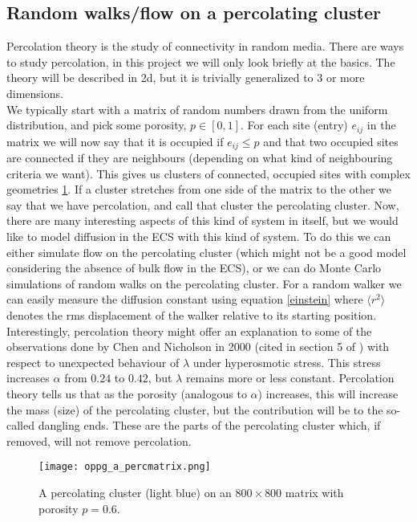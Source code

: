 \documentclass[a4paper,english, 12pt, twoside]{article}
\begin{document}
\subsection{Random walks/flow on a percolating cluster}
Percolation theory is the study of connectivity in random media. There are ways to study percolation, in this project we will only look briefly at the basics. The theory will be described in 2d, but it is trivially generalized to 3 or more dimensions.\\
We typically start with a matrix of random numbers drawn from the uniform distribution, and pick some porosity, $p\in[0,1]$. 
For each site (entry) $e_{ij}$ in the matrix we will now say that it is occupied if $e_{ij} \leq p$ and that two occupied sites are connected if they are neighbours (depending on what kind of neighbouring criteria we want). 
This gives us clusters of connected, occupied sites with complex geometries \ref{perc}. 
If a cluster stretches from one side of the matrix to the other we say that we have percolation, and call that cluster the percolating cluster. 
Now, there are many interesting aspects of this kind of system in itself, but we would like to model diffusion in the ECS with this kind of system. 
To do this we can either simulate flow on the percolating cluster (which might not be a good model considering the absence of bulk flow in the ECS), or we can do Monte Carlo simulations of random walks on the percolating cluster. 
For a random walker we can easily measure the diffusion constant using equation \ref{einstein} where $\langle r^2\rangle$ denotes the rms displacement of the walker relative to its starting position. \\
Interestingly, percolation theory might offer an explanation to some of the observations done by Chen and Nicholson in 2000 (cited in section 5 of \cite{hrabetova2004contribution}) with respect to unexpected behaviour of $\lambda$ under hyperosmotic stress. 
This stress increases $\alpha$ from $0.24$ to $0.42$, but $\lambda$ remains more or less constant. 
Percolation theory tells us that as the porosity (analogous to $\alpha$) increases, this will increase the mass (size) of the percolating cluster, but the contribution will be to the so-called dangling ends. These are the parts of the percolating cluster which, if removed, will not remove percolation.

\begin{figure}[H]
 \centering
 \texttt{[image: oppg\_a\_percmatrix.png]}
 \caption{A percolating cluster (light blue) on an $800\times800$ matrix with porosity $p=0.6$.}
 \label{perc}
\end{figure}
\end{document}
